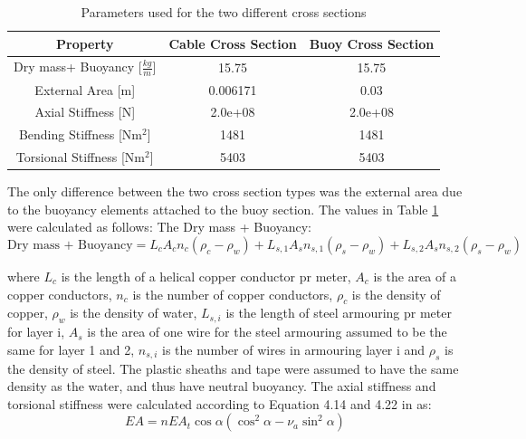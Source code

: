 \begin{table} [H]
\centering
\begin{tabular}{ |c|c|c|}
\hline
Property& Cable Cross Section & Buoy Cross Section \\
 \hline
 \hline
Dry mass+ Buoyancy [$\frac{kg}{m}$] & 15.75 & 15.75\\
External Area [m]& 0.006171 & 0.03\\
Axial Stiffness [N] & 2.0e+08 & 2.0e+08\\
Bending Stiffness [Nm$^2$] & 1481 & 1481\\
Torsional Stiffness [Nm$^2$] & 5403 & 5403\\
 \hline
\end{tabular}
\caption{Parameters used for the two different cross sections}
\label{table:crosssima}
\end{table}
\noindent The only difference between the two cross section types was the external area due to the buoyancy elements attached to the buoy section. The values in Table \ref{table:crosssima} were calculated as follows:\newline
\newline 
\noindent The Dry mass + Buoyancy: 
\begin{equation}
\text{Dry mass + Buoyancy}=L_{c} A_cn_c (\rho_c-\rho_w) + L_{s,1} A_{s}n_{s,1} (\rho_s-\rho_w)+L_{s,2} A_{s}n_{s,2} (\rho_s-\rho_w)
\end{equation}

\noindent where $L_c$ is the length of a helical copper conductor pr meter, $A_c$ is the area of a copper conductors, $n_c$ is the number of copper conductors, $\rho_c$ is the density of copper, $\rho_w$ is the density of water, $L_{s,i}$ is the length of steel armouring pr meter for layer i, $A_s$ is the area of one wire for the steel armouring assumed to be the same for layer 1 and 2, $n_{s,i}$ is the number of wires in armouring layer i and $\rho_s$ is the density of steel. The plastic sheaths and tape were assumed to have the same density as the water, and thus have neutral buoyancy. \newline
\newline 
The axial stiffness and torsional stiffness were calculated according to Equation 4.14 and 4.22 in \cite{Savik2016} as:
\begin{equation}
    EA=nEA_t \cos\alpha(\cos^2\alpha-\nu_a \sin^2\alpha)
\end{equation}

